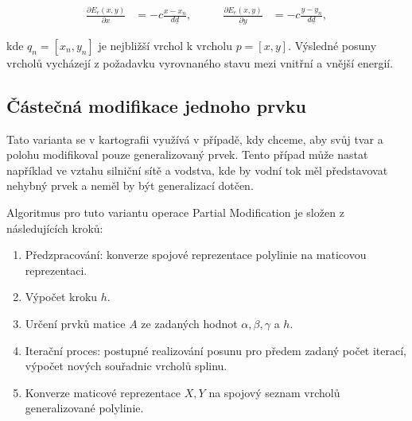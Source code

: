 \begin{equation*}\begin{split}
    \frac{\partial E_e(x,y)}{\partial x} &= -c \frac{x - x_n}{d \underline{\textit{d}}}, & \qquad
    \frac{\partial E_e(x,y)}{\partial y} &= -c \frac{y - y_n}{d \underline{\textit{d}}},
\end{split}
\end{equation*}

kde $q_n = [x_n, y_n]$ je nejbližší vrchol k vrcholu $p = [x, y]$. Výsledné posuny vrcholů vycházejí z požadavku vyrovnaného stavu mezi vnitřní a vnější energií.

\subsection*{Částečná modifikace jednoho prvku}
\par Tato varianta se v kartografii využívá v případě, kdy chceme, aby svůj tvar a polohu modifikoval pouze generalizovaný prvek. Tento případ může nastat například ve vztahu silniční sítě a vodstva, kde by vodní tok měl představovat nehybný prvek a neměl by být generalizací dotčen. 
\par Algoritmus pro tuto variantu operace Partial Modification je složen z následujících kroků:
\begin{enumerate}
    \item  Předzpracování: konverze spojové reprezentace polylinie na maticovou reprezentaci.
    \item Výpočet kroku $h$.
    \item Určení prvků matice $A$ ze zadaných hodnot $\alpha, \beta, \gamma$ a $h$.
    \item Iterační proces: postupné realizování posunu pro předem zadaný počet iterací, výpočet nových souřadnic vrcholů splinu.
    \item Konverze maticové reprezentace $X, Y$ na spojový seznam vrcholů generalizované polylinie.
\end{enumerate}